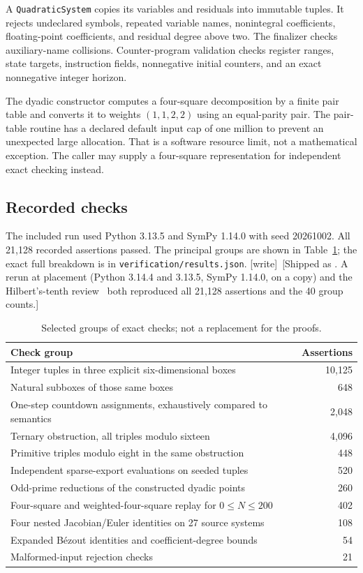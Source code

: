 \documentclass[11pt,a4paper]{article}
\theoremstyle{definition}
\theoremstyle{remark}
\newcommand{\wtag}{\textup{[write]}}
\begin{document}
A \texttt{QuadraticSystem} copies its variables and residuals into immutable
tuples. It rejects undeclared symbols, repeated variable names,
nonintegral coefficients, floating-point coefficients, and residual degree
above two. The finalizer checks auxiliary-name collisions. Counter-program
validation checks register ranges, state targets, instruction fields,
nonnegative initial counters, and an exact nonnegative integer horizon.

The dyadic constructor computes a four-square decomposition by a finite
pair table and converts it to weights $(1,1,2,2)$ using an equal-parity
pair. The pair-table routine has a declared default input cap of one
million to prevent an unexpected large allocation. That is a software
resource limit, not a mathematical exception. The caller may supply a
four-square representation for independent exact checking instead.

\subsection{Recorded checks}

The included run used Python 3.13.5 and SymPy 1.14.0 with seed 20261002.
All 21,128 recorded assertions passed. The principal groups are shown in
Table~\ref{sdf:tab:checks}; the exact full breakdown is in
\texttt{verification/results.json}.
\wtag\ [Shipped as . A rerun at
placement (Python 3.14.4 and 3.13.5, SymPy 1.14.0, on a copy) and the
Hilbert's-tenth review~\cite{review13} both reproduced all 21,128 assertions
and the 40 group counts.]

\begin{table}[htbp]
\centering
\small
\begin{tabular}{p{}r}
\toprule
Check group & Assertions\\
\midrule
Integer tuples in three explicit six-dimensional boxes & 10,125\\
Natural subboxes of those same boxes & 648\\
One-step countdown assignments, exhaustively compared to semantics & 2,048\\
Ternary obstruction, all triples modulo sixteen & 4,096\\
Primitive triples modulo eight in the same obstruction & 448\\
Independent sparse-export evaluations on seeded tuples & 520\\
Odd-prime reductions of the constructed dyadic points & 260\\
Four-square and weighted-four-square replay for $0\le N\le200$ & 402\\
Four nested Jacobian/Euler identities on 27 source systems & 108\\
Expanded B\'ezout identities and coefficient-degree bounds & 54\\
Malformed-input rejection checks & 21\\
\bottomrule
\end{tabular}
\caption{Selected groups of exact checks; not a replacement for the proofs.}
\label{sdf:tab:checks}
\end{table}
\end{document}
